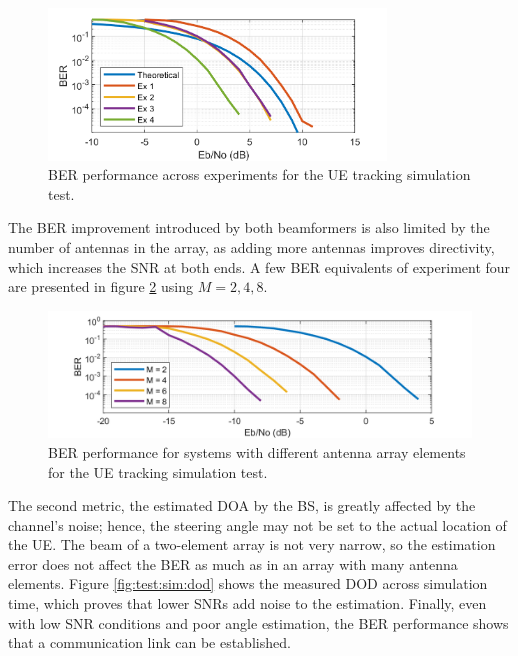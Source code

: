 \documentclass[12pt,a4paper]{report}
\begin{document}
\begin{figure}[h]
    \centering
    \includegraphics[width = 0.8\textwidth]{Figures/bf_ber_ebno.png}
    \caption{BER performance across experiments for the UE tracking simulation test.}
    \label{fig:test:sim:ber}
\end{figure}

The BER improvement introduced by both beamformers is also limited by the number of antennas in the array, as adding more antennas improves directivity, which increases the SNR at both ends. A few BER equivalents of experiment four are presented in figure \ref{fig:test:sim:ber_m} using $M = 2, 4, 8$.

\begin{figure}[h]
    \centering
    \includegraphics[width = \textwidth]{Figures/bf_ber_ebno_m.png}
    \caption{BER performance for systems with different antenna array elements for the UE tracking simulation test.}
    \label{fig:test:sim:ber_m}
\end{figure}

The second metric, the estimated DOA by the BS, is greatly affected by the channel's noise; hence, the steering angle may not be set to the actual location of the UE. The beam of a two-element array is not very narrow, so the estimation error does not affect the BER as much as in an array with many antenna elements. Figure \ref{fig:test:sim:dod} shows the measured DOD across simulation time, which proves that lower SNRs add noise to the estimation. Finally, even with low SNR conditions and poor angle estimation, the BER performance shows that a communication link can be established.
\end{document}

